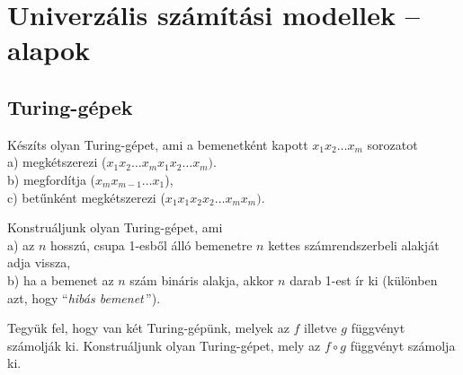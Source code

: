 \chapter{Univerz\'alis sz\'am\'it\'asi modellek -- alapok}

\section{Turing-g\'epek}

\begin{Exercise}[counter={sorszam}, difficulty=0] 
	Készíts olyan Turing-gépet, ami a bemenetként kapott $x_1x_2\ldots x_m$ sorozatot\\
	a) megkétszerezi ($x_1x_2\ldots x_m x_1x_2\ldots x_m)$.\\
	b) megford\'itja ($x_mx_{m-1}\ldots x_1$),\\
	c) bet\H unként megkétszerezi ($x_1x_1x_2x_2\ldots x_m x_m)$.
\end{Exercise}	 


\begin{Exercise}[counter={sorszam}, difficulty=0]
	Konstruáljunk olyan Turing-gépet, ami\\
	a) az $n$ hosszú, csupa 1-esb\H ol álló bemenetre $n$ kettes számrendszerbeli alakját adja vissza,\\
	b) ha a bemenet az $n$ szám bináris alakja, akkor $n$ darab 1-est ír ki (különben azt, hogy ``{\it hibás bemenet}\,'').
\end{Exercise}	 


\begin{Exercise}[counter={sorszam}, difficulty=0]
	Tegyük fel, hogy van két Turing-gépünk, melyek az $f$ illetve $g$ függvényt számolják ki. Konstruáljunk olyan Turing-gépet, mely az $f\circ g$ függvényt számolja ki.
\end{Exercise}	 


